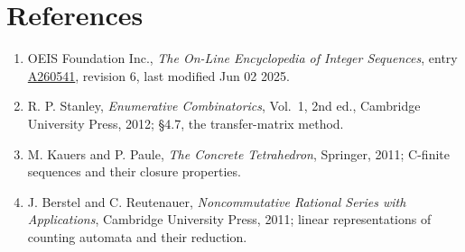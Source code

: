 \documentclass[11pt]{article}
\theoremstyle{definition}
\begin{document}
\section{References}

\begin{enumerate}

\item OEIS Foundation Inc., \emph{The On-Line Encyclopedia of Integer Sequences}, entry \href{https://oeis.org/A260541}{A260541}, revision 6, last modified Jun 02 2025.

\item R. P. Stanley, \emph{Enumerative Combinatorics}, Vol.~1, 2nd ed., Cambridge University Press, 2012; \S4.7, the transfer-matrix method.

\item M. Kauers and P. Paule, \emph{The Concrete Tetrahedron}, Springer, 2011; C-finite sequences and their closure properties.

\item J. Berstel and C. Reutenauer, \emph{Noncommutative Rational Series with Applications}, Cambridge University Press, 2011; linear representations of counting automata and their reduction.

\end{enumerate}
\end{document}
